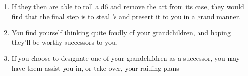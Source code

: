 \documentclass[green]{LRSguildcamp1}
\begin{document}
\begin{enumerate}

\item If they then are able to roll a d6 and remove the art from its case, they would find that the final step is to steal \cOS{}'s \iBagofHolding{} and present it to you in a grand manner. 

\item You find yourself thinking quite fondly of your grandchildren, and hoping they'll be worthy successors to you.

\item If you choose to designate one of your grandchildren as a successor, you may have them assist you in, or take over, your raiding plans

\end{enumerate}
\end{document}
